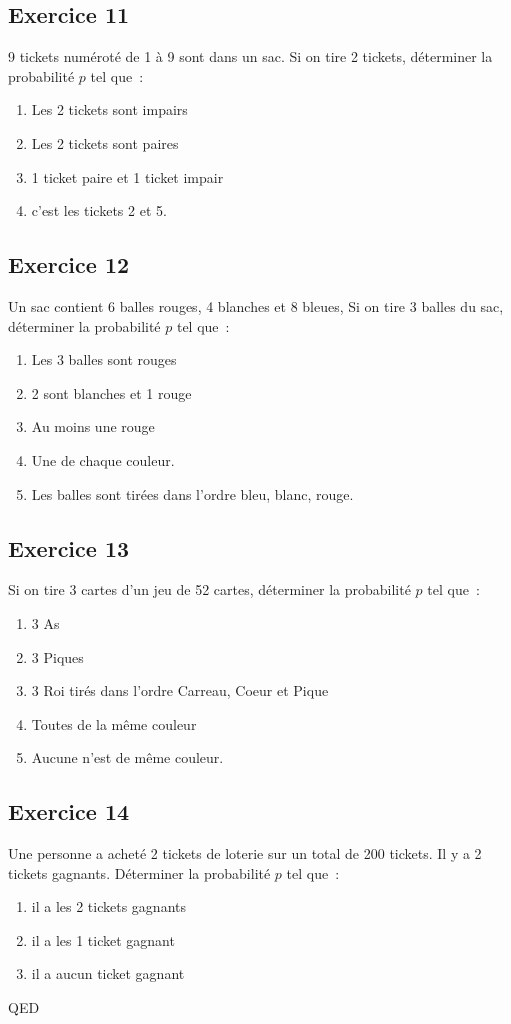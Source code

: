 \documentclass[]{book}
\theoremstyle{definition}
\begin{document}
\subsection*{Exercice 11}
9 tickets num\'erot\'e de 1 \`a 9 sont dans un sac. Si on tire 2 tickets, d\'eterminer la probabilit\'e $p$ tel que\ :
\begin{enumerate}
\item Les 2 tickets sont impairs
\item Les 2 tickets sont paires
\item 1 ticket paire et 1 ticket impair
\item c'est les tickets 2 et 5.
\end{enumerate}

\subsection*{Exercice 12}
Un sac contient 6 balles rouges, 4 blanches et 8 bleues, Si on tire 3 balles du sac, d\'eterminer la probabilit\'e $p$ tel que\ :
\begin{enumerate}
\item Les 3 balles sont rouges
\item 2 sont blanches et 1 rouge 
\item Au moins une rouge
\item Une de chaque couleur.
\item Les balles sont tir\'ees dans l'ordre bleu, blanc, rouge.
\end{enumerate}

\subsection*{Exercice 13}
Si on tire 3 cartes d'un jeu de 52 cartes, d\'eterminer la probabilit\'e $p$ tel que\ :
\begin{enumerate}
\item 3 As
\item 3 Piques
\item 3 Roi tir\'es dans l'ordre Carreau, Coeur et Pique 
\item Toutes de la m\^eme couleur
\item Aucune n'est de m\^eme couleur.
\end{enumerate}

\subsection*{Exercice 14}
Une personne a achet\'e 2 tickets de loterie sur un total de 200 tickets. Il y a 2 tickets gagnants. D\'eterminer la probabilit\'e $p$ tel que\ :
\begin{enumerate}
\item il a les 2 tickets gagnants
\item il a les 1 ticket gagnant
\item il a aucun ticket gagnant
\end{enumerate}




QED
\end{document}

